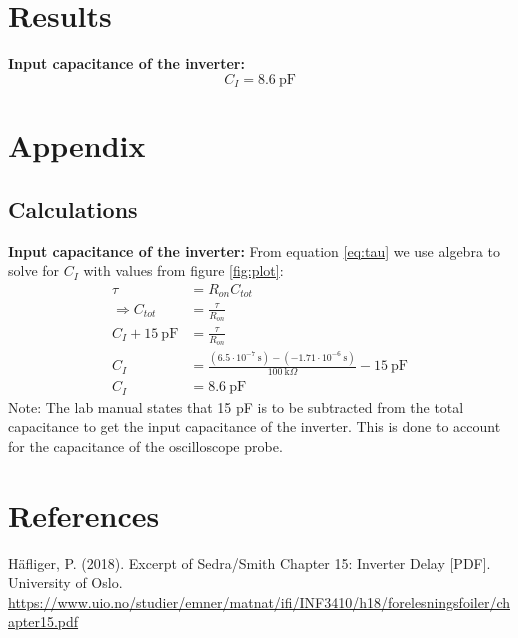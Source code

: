 \documentclass[onecolumn]{article}
\begin{document}
\section{Results}
\textbf{Input capacitance of the inverter:}
\begin{equation}
    C_{I} = 8.6 \ \text{pF}
\end{equation}




\section{Appendix}
\subsection{Calculations}
\textbf{Input capacitance of the inverter:}
From equation \ref{eq:tau} we use algebra to solve for $C_{I}$ with values from figure \ref{fig:plot}:
\begin{align}
    \tau &= R_{on}C_{tot} \nonumber \\
    \Rightarrow C_{tot} &= \frac{\tau}{R_{on}} \nonumber \\
    C_{I} + 15 \ \text{pF} &= \frac{\tau}{R_{on}} \nonumber \\
    C_{I} &= \frac{(6.5\cdot 10^{-7} \ \text{s}) - (-1.71 \cdot 10^{-6} \ \text{s})}{100 \ \text{k}\Omega} - 15 \ \text{pF}\nonumber \\
    C_{I} &= 8.6 \ \text{pF} \nonumber
\end{align}
Note: The lab manual states that 15 pF is to be subtracted from the total capacitance to get the input capacitance of the inverter. This is done to account for the capacitance of the oscilloscope probe.
\section{References}

Häfliger, P. (2018). Excerpt of Sedra/Smith Chapter 15: Inverter Delay [PDF]. University of Oslo. \url{https://www.uio.no/studier/emner/matnat/ifi/INF3410/h18/forelesningsfoiler/chapter15.pdf}
\end{document}
